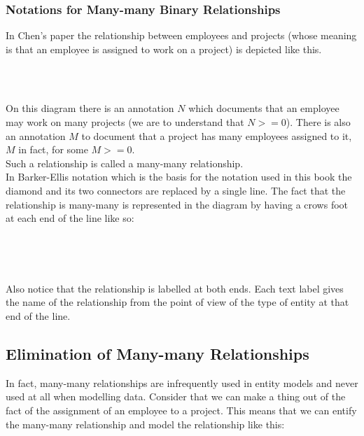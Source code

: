 \subsubsection*{Notations for Many-many Binary Relationships}
In Chen's paper the relationship between employees and projects (whose meaning is that
an employee is assigned to work on a project) is depicted like this.
\begin{gather}
\label{projectWorkerChenStyle}
\raisebox{-0.9cm}{\scalebox{0.9}{

}}
\end{gather}
On this diagram there is an annotation $N$ which documents that an employee may work on many projects (we are to understand that $N >= 0$). There is also an annotation $M$ to document that
a project has many employees assigned to it, $M$ in fact, for some $M >= 0$. \\
\noindent Such a relationship is called a many-many relationship.  \\
\noindent In Barker-Ellis notation which is the basis for the notation used in this book the diamond and its two connectors are replaced by a single line. The fact that the relationship is many-many is represented in the diagram by having a crows foot at each end of the line like so:

\begin{gather}
\label{projectWorkerOurStyle}
\raisebox{-1cm}{

}
\end{gather}

\noindent Also notice that the relationship is labelled at both ends. Each text label gives the name of the relationship from the point of view of the type of entity at that end of the line.

\subsection*{Elimination of Many-many Relationships}
\noindent In fact, many-many relationships are infrequently used in entity models and never used at all when modelling data.
Consider that we can make a thing out of the fact of the assignment of an employee to a project. This means that we can entify the many-many relationship and model the relationship like this:
\begin{gather}
\label{projectWorkerOurStyleMediated}
\raisebox{-1cm}{

}
\end{gather}

